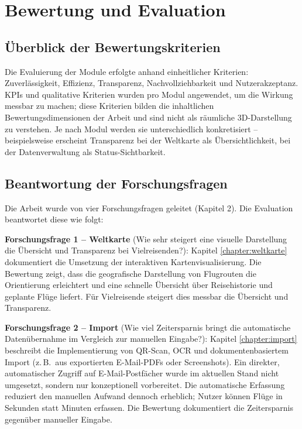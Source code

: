 \chapter{Bewertung und Evaluation}\label{chapter:evaluation}

\section{Überblick der Bewertungskriterien}
Die Evaluierung der Module erfolgte anhand einheitlicher Kriterien: Zuverlässigkeit,
Effizienz, Transparenz, Nachvollziehbarkeit und Nutzerakzeptanz. KPIs und qualitative
Kriterien wurden pro Modul angewendet, um die Wirkung messbar zu machen; diese Kriterien
bilden die inhaltlichen Bewertungsdimensionen der Arbeit und sind nicht als räumliche
3D-Darstellung zu verstehen. Je nach Modul werden sie unterschiedlich konkretisiert --
beispielsweise erscheint Transparenz bei der Weltkarte als Übersichtlichkeit, bei der
Datenverwaltung als Status-Sichtbarkeit.

\section{Beantwortung der Forschungsfragen}
Die Arbeit wurde von vier Forschungsfragen geleitet (Kapitel 2). Die Evaluation
beantwortet diese wie folgt:

\textbf{Forschungsfrage 1 – Weltkarte} (\glqq{}Wie sehr steigert eine visuelle
Darstellung die Übersicht und Transparenz bei Vielreisenden?\grqq{}): Kapitel
\ref{chapter:weltkarte} dokumentiert die Umsetzung der interaktiven Kartenvisualisierung.
Die Bewertung zeigt, dass die geografische Darstellung von Flugrouten die Orientierung
erleichtert und eine schnelle Übersicht über Reisehistorie und geplante Flüge liefert.
Für Vielreisende steigert dies messbar die Übersicht und Transparenz.

\textbf{Forschungsfrage 2 – Import} (\glqq{}Wie viel Zeitersparnis bringt die
automatische Datenübernahme im Vergleich zur manuellen Eingabe?\grqq{}): Kapitel
\ref{chapter:import} beschreibt die Implementierung von QR-Scan, OCR und dokumentenbasiertem
Import (z.\,B.\ aus exportierten E-Mail-PDFs oder Screenshots).
Ein direkter, automatischer Zugriff auf E-Mail-Postfächer wurde im aktuellen Stand nicht
umgesetzt, sondern nur konzeptionell vorbereitet.
Die automatische Erfassung reduziert den manuellen Aufwand dennoch erheblich; Nutzer können
Flüge in Sekunden statt Minuten erfassen.
Die Bewertung dokumentiert die Zeitersparnis gegenüber manueller Eingabe.

